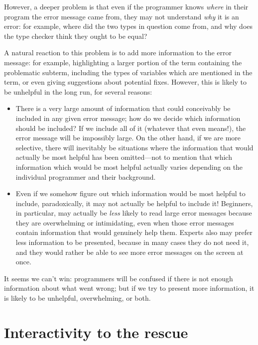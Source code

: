 \documentclass[sigplan, screen]{acmart}\settopmatter{printccs=false,printacmref=false}
\begin{document}
However, a deeper problem is that even if the programmer knows
\emph{where} in their program the error message came from, they may
not understand \emph{why} it is an error: for example, where
did the two types in question come from, and why does the type checker
think they ought to be equal?

A natural reaction to this problem is to add more information to the
error message: for example, highlighting a larger portion of the term
containing the problematic subterm, including the types of variables
which are mentioned in the term, or even giving suggestions about
potential fixes.  However, this is likely to be unhelpful in the long
run, for several reasons:

\begin{itemize}
\item There is a very large amount of information that could
  conceivably be included in any given error message; how do we decide
  which information should be included?  If we include all of it
  (whatever that even means!), the error message will be impossibly
  large. On the other hand, if we are more selective, there will
  inevitably be situations where the information that would actually
  be most helpful has been omitted---not to mention that which
  information which would be most helpful actually varies depending on
  the individual programmer and their background.
\item Even if we somehow figure out which information would be most
  helpful to include, paradoxically, it may not actually be helpful to
  include it!  Beginners, in particular, may actually be \emph{less}
  likely to read large error messages because they are overwhelming or
  intimidating, even when those error messages contain information
  that would genuinely help them.  Experts also may prefer less
  information to be presented, because in many cases they do not need
  it, and they would rather be able to see more error messages on the
  screen at once.
\end{itemize}

It seems we can't win: programmers will be confused if there is not enough
information about what went wrong; but if we try to present more
information, it is likely to be unhelpful, overwhelming, or both.

\section{Interactivity to the rescue}
\end{document}
